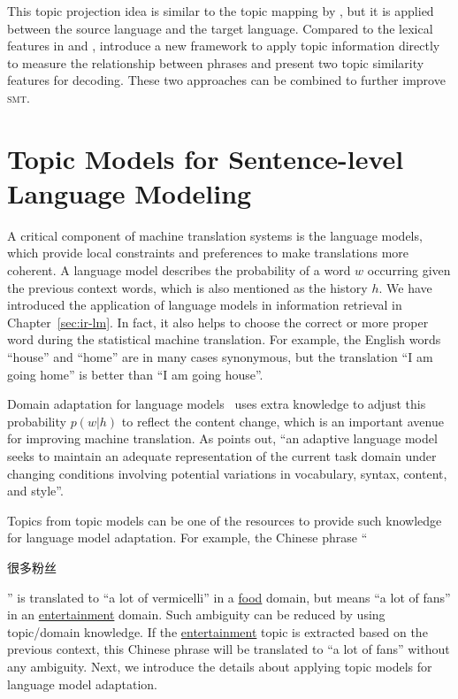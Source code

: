 This topic projection idea is similar to the topic mapping by
\citet{su-12}, but it is applied between the source language and the
target language. Compared to the lexical features in
\citet{Eidelman-12} and \citet{hu-14}, \citet{xiao-12} introduce a new
framework to apply topic information directly to measure the relationship between phrases and present two topic similarity features for decoding. These two approaches can
be combined to further improve \textsc{smt}.


\section{Topic Models for Sentence-level Language Modeling}


A critical component of machine translation systems is the language
models, which provide local constraints and preferences to make
translations more coherent. A language model describes the probability
of a word $w$ occurring given the previous context words, which is
also mentioned as the history $h$. We have introduced the application
of language models in information retrieval in
Chapter~\ref{sec:ir-lm}. In fact, it also helps to choose the correct
or more proper word during the statistical machine translation. For
example, the English words ``house'' and ``home'' are in many cases synonymous, but the translation ``I am going home'' is better than
``I am going house''.

Domain adaptation for language models~\citep{Bellegarda-04,wood-09}
uses extra knowledge to adjust this probability $p(w|h)$ to reflect
the content change, which is an important avenue for improving machine
translation. As \citet{Bellegarda-04} points out, ``an adaptive
language model seeks to maintain an adequate representation of the
current task domain under changing conditions involving potential
variations in vocabulary, syntax, content, and style''.

Topics from topic models can be one of the resources to provide such
knowledge for language model adaptation. For example, the Chinese
phrase ``\begin{CJK*}{UTF8}{gbsn}很多粉丝\end{CJK*}'' is translated to
  ``a lot of vermicelli'' in a \underline{food} domain, but means ``a
  lot of fans'' in an \underline{entertainment} domain. Such ambiguity
  can be reduced by using topic/domain knowledge. If the \underline{entertainment} topic is extracted based on
  the previous context, this Chinese phrase will be translated to ``a
  lot of fans'' without any ambiguity. Next, we introduce the details
  about applying topic models for language model adaptation.

